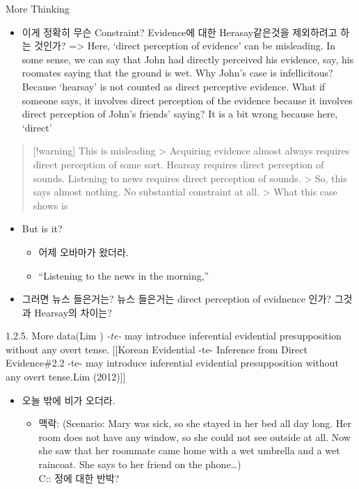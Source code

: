 More Thinking

\begin{itemize}
\tightlist
\item
  이게 정확히 무슨 Constraint? Evidence에 대한 Herasay같은것을
  제외하려고 하는 것인가? =\textgreater{} Here, `direct perception of
  evidence' can be misleading. In some sense, we can say that John had
  directly perceived his evidence, say, his roomates saying that the
  ground is wet. Why John's case is infellicitous? Because `hearsay' is
  not counted as direct perceptive evidence. What if someone says, it
  involves direct perception of the evidence because it involves direct
  perception of John's friends' saying? It is a bit wrong because here,
  `direct'
\end{itemize}

\begin{quote}
{[}!warning{]} This is misleading \textgreater{} Acquiring evidence
almost always requires direct perception of some sort. Hearsay requires
direct perception of sounds. Listening to news requires direct
perception of sounds. \textgreater{} So, this says almost nothing. No
substantial constraint at all. \textgreater{} What this case shows is
\end{quote}

\begin{itemize}
\tightlist
\item
  But is it?

  \begin{itemize}
  \tightlist
  \item
    어제 오바마가 왔더라.
  \item
    ``Listening to the news in the morning,''
  \end{itemize}
\item
  그러면 뉴스 들은거는? 뉴스 들은거는 direct perception of evidnence
  인가? 그것과 Hearsay의 차이는?
\end{itemize}

1.2.5. More data(Lim ) \emph{-te-} may introduce inferential evidential
presupposition without any overt tense. {[}{[}Korean Evidential -te-
Inference from Direct Evidence\#2.2 -te- may introduce inferential
evidential presupposition without any overt tense.\textbar Lim
(2012){]}{]}

\begin{itemize}
\tightlist
\item
  오늘 밖에 비가 오더라.

  \begin{itemize}
  \tightlist
  \item
    맥락: (Scenario: Mary was sick, so she stayed in her bed all day
    long. Her room does not have any window, so she could not see
    outside at all. Now she saw that her roommate came home with a wet
    umbrella and a wet raincoat. She says to her friend on the
    phone\ldots)\\
    C:: 정에 대한 반박?
  \end{itemize}
\end{itemize}

